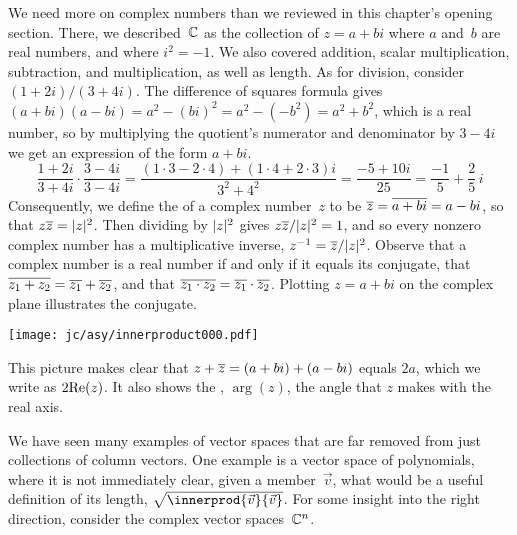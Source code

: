 We need more on complex numbers than we reviewed in this
chapter's opening section.
There, we described~$\mathbb{C}$ as 
the collection of $z=a+bi$ where $a$ and~$b$ are real numbers,
and where $i^2=-1$. 
We also covered addition, scalar multiplication,
subtraction, and multiplication, as well as length.
As for division,  consider $(1+2i)/(3+4i)$.
The difference of squares formula
gives $(a+bi)(a-bi)=a^2-(bi)^2=a^2-(-b^2)=a^2+b^2$,
which is a real number,
so
by multiplying the quotient's numerator and denominator by $3-4i$
we get an expression of the form $a+bi$.
\begin{equation*}
  \frac{1+2i}{3+4i}\cdot\frac{3-4i}{3-4i}
  =
  \frac{(1\cdot 3-2\cdot 4)+(1\cdot 4+2\cdot 3)i}{3^2+4^2}
  =
  \frac{-5+10i}{25}
  =
  \frac{-1}{5}+\frac{2}{5}\,i
\end{equation*}
Consequently, we define the  of a complex number~$z$
to be $\overline{z}=\overline{a+bi}=a-bi$, so that $z\overline{z}=\lvert z\rvert^2$.
Then dividing by $\lvert z\rvert^2$ gives $z\overline{z}/\lvert z\rvert^2=1$,
and so  
every nonzero complex number has a multiplicative inverse,
$z^{-1}=\overline{z}/\lvert z\rvert^2$.
Observe that a complex number is a real number if and only if 
it equals its conjugate, 
that $\overline{z_1+z_2}=\overline{z_1}+\overline{z_2}$,
and that $\overline{z_1\cdot z_2}=\overline{z_1}\cdot\overline{z_2}$.
Plotting $z=a+bi$ on the 
complex plane 
illustrates the conjugate.
\begin{center}
  \texttt{[image: jc/asy/innerproduct000.pdf]}
\end{center}
This picture makes clear that 
$z+\overline{z}=(a+bi)+(a-bi)$ equals
$2a$, which we write as $2\mathrm{Re}(z)$.
It also shows the , $\arg(z)$, the angle that
$z$ makes with the real axis.

We have seen many examples of vector spaces that are far removed from
just collections of column vectors.
One example is a vector space of polynomials, where it is not immediately
clear, given a member~$\vec{v}$,
what would be a useful definition of its length, 
$\sqrt{\innerprod{\vec{v}}{\vec{v}}}$.
For some insight into the right direction, consider the complex
vector spaces~$\mathbb{C}^n$.


